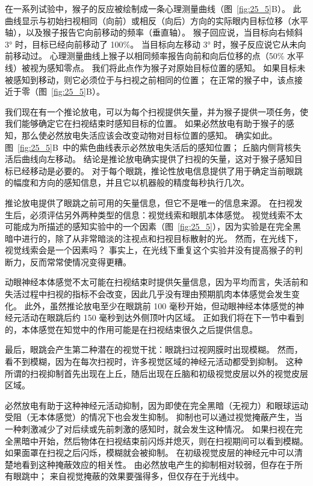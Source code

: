在一系列试验中，猴子的反应被绘制成一条心理测量曲线（图~\ref{fig:25_5}B）。
此曲线显示与初始扫视相同（向前）或相反（向后）方向的实际眼内目标位移（水平轴），以及猴子报告它向前移动的频率（垂直轴）。
猴子回应说，当目标向右倾斜 3° 时，目标已经向前移动了 100\%。
当目标向左移动 3° 时，猴子反应说它从未向前移动过。
心理测量曲线上猴子以相同频率报告向前和向后位移的点（50\% 水平线）被视为感知零点。
我们将此点作为猴子对原始目标位置的感知。
如果目标未被感知到移动，则它必须位于与扫视之前相同的位置；
在正常的猴子中，该点接近于零（图~\ref{fig:25_5}B）。


我们现在有一个推论放电，可以为每个扫视提供矢量，并为猴子提供一项任务，使我们能够确定它在扫视结束时感知目标的位置。
如果必然放电有助于猴子的感知，那么使必然放电失活应该会改变动物对目标位置的感知。
确实如此。 图~\ref{fig:25_5}B~中的紫色曲线表示必然放电失活后的感知位置；
丘脑内侧背核失活后曲线向左移动。
结论是推论放电确实提供了扫视的矢量，这对于猴子感知目标已经移动是必要的。
对于每个眼跳，推论性放电信息提供了用于确定当前眼跳的幅度和方向的感知信息，并且它以机器般的精度每秒执行几次。


推论放电提供了眼跳之前可用的矢量信息，但它不是唯一的信息来源。
在扫视发生后，必须评估另外两种类型的信息：视觉线索和眼肌本体感觉。
视觉线索不太可能成为所描述的感知实验中的一个因素（图~\ref{fig:25_5}），因为实验是在完全黑暗中进行的，除了从非常暗淡的注视点和扫视目标散射的光。
然而，在光线下，视觉线索会是一个因素吗？
事实上，在光线下重复这个实验并没有提高猴子的判断力，反而常常使情况变得更糟。


动眼神经本体感觉不太可能在扫视结束时提供矢量信息，因为平均而言，失活前和失活过程中扫视的指标不会改变，因此几乎没有理由预期肌肉本体感觉会发生变化。
此外，虽然推论放电至少在眼跳前 100 毫秒开始，但动眼神经本体感觉的神经元活动在眼跳后约 150 毫秒到达外侧顶叶内区域。
正如我们将在下一节中看到的，本体感觉在知觉中的作用可能是在扫视结束很久之后提供信息。


最后，眼跳会产生第二种潜在的视觉干扰：眼跳扫过视网膜时出现模糊。
然而，看不到模糊，因为在每次扫视时，许多视觉区域的神经元活动都受到抑制。
这种所谓的扫视抑制首先出现在上丘，随后出现在丘脑和初级视觉皮层以外的视觉皮层区域。


必然放电有助于这种神经元活动抑制，因为即使在完全黑暗（无视力）和眼球运动受阻（无本体感觉）的情况下也会发生抑制。
抑制也可以通过视觉掩蔽产生，当一种刺激减少了对后续或先前刺激的感知时，就会发生这种情况。
如果扫视在完全黑暗中开始，然后物体在扫视结束前闪烁并熄灭，则在扫视期间可以看到模糊。
如果面罩在扫视之后闪烁，模糊就会被抑制。
在初级视觉皮层的神经元中可以清楚地看到这种掩蔽效应的相关性。
由必然放电产生的抑制相对较弱，但存在于所有眼跳中；
来自视觉掩蔽的效果要强得多，但仅存在于光线中。



